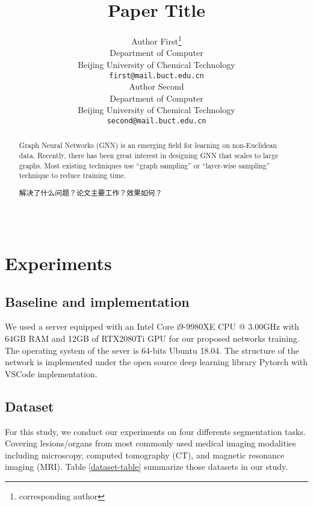 \documentclass[UTF8]{article} %
\title{Paper Title}
\author{%
  Author First\thanks{corresponding author} \\
  Department of Computer \\
  Beijing University of Chemical Technology \\
  \texttt{first@mail.buct.edu.cn} \\
  \And
  Author Second \\  
  Department of Computer \\
  Beijing University of Chemical Technology \\
  \texttt{second@mail.buct.edu.cn} \\
}
\begin{document}
\maketitle

\begin{abstract}
Graph Neural Networks (GNN) is an emerging field for learning on non-Euclidean data. Recently, there has been great interest in designing GNN that scales to large graphs. Most existing techniques use ``graph sampling'' or ``layer-wise sampling'' technique to reduce training time. 

解决了什么问题？论文主要工作？效果如何？
~\\
~\\
~\\
\end{abstract}

\section{Experiments}
\subsection{Baseline and implementation}
We used a server equipped with an Intel Core i9-9980XE CPU @ 3.00GHz with 64GB RAM and 12GB of RTX2080Ti GPU for
our proposed networks training. The operating system of the sever is 64-bits Ubuntu 18.04. The structure of the network 
is implemented under the open source deep learning library Pytorch with VSCode implementation.

\subsection{Dataset}
For this study, we conduct our experiments on four differents segmentation tasks. 
Covering lesions/organs from most commonly used medical imaging modalities including microscopy, 
computed tomography (CT), and magnetic resonance imaging (MRI).  Table \ref{dataset-table} summarize those datasets in our study.
\end{document}
